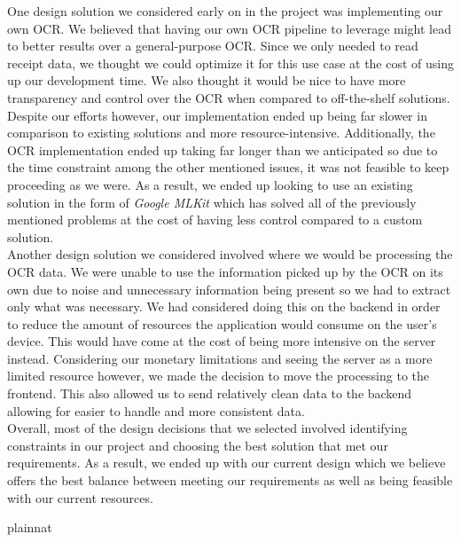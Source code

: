 \documentclass[12pt, titlepage]{article}
\begin{document}
\begin{enumerate}
  One design solution we considered early on in the project was implementing our own OCR. We believed
  that having our own OCR pipeline to leverage might lead to better results over a general-purpose
  OCR. Since we only needed to read receipt data, we thought we could optimize it for this use case
  at the cost of using up our development time. We also thought it would be nice to have more transparency
  and control over the OCR when compared to off-the-shelf solutions. Despite our efforts however, our implementation ended up
  being far slower in comparison to existing solutions and more resource-intensive. Additionally,
  the OCR implementation ended up taking far longer than we anticipated so due to the time constraint among the other mentioned issues,
  it was not feasible to keep proceeding as we were. As a result, we ended up looking to use an existing
  solution in the form of \textit{Google MLKit} which has solved all of the previously mentioned problems
  at the cost of having less control compared to a custom solution. \\

  Another design solution we considered involved where we would be processing the OCR data. We were
  unable to use the information picked up by the OCR on its own due to noise and unnecessary information
  being present so we had to extract only what was necessary. We had considered doing this on the backend
  in order to reduce the amount of resources the application would consume on the user's device. This
  would have come at the cost of being more intensive on the server instead. Considering
  our monetary limitations and seeing the server as a more limited resource however, we made the decision
  to move the processing to the frontend. This also allowed us to send relatively clean data to the backend
  allowing for easier to handle and more consistent data. \\

  Overall, most of the design decisions that we selected involved identifying constraints in our project
  and choosing the best solution that met our requirements. As a result, we ended up with our current
  design which we believe offers the best balance between meeting our requirements as well as being
  feasible with our current resources.
\end{enumerate}

\newpage{}


 {plainnat}

\end{document}
